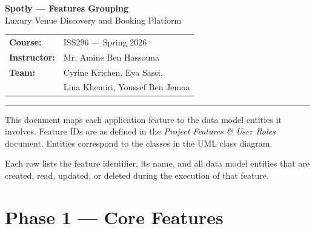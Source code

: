 \documentclass[12pt,a4paper]{article}
\begin{document}
\begin{center}
    {\LARGE\bfseries Spotly --- Features Grouping}\\[0.5em]
    {\large Luxury Venue Discovery and Booking Platform}\\[1em]
    \begin{tabular}{ll}
        \textbf{Course:}      & ISS296 --- Spring 2026 \\
        \textbf{Instructor:}  & Mr. Amine Ben Hassouna \\
        \textbf{Team:}        & Cyrine Krichen, Eya Sassi, \\
                              & Lina Khemiri, Youssef Ben Jemaa \\
    \end{tabular}
\end{center}

\vspace{1.5em}
\hrule
\vspace{1.5em}

This document maps each application feature to the data model entities it
involves. Feature IDs are as defined in the \emph{Project Features \& User
Roles} document. Entities correspond to the classes in the UML class diagram.

\vspace{1em}
Each row lists the feature identifier, its name, and all data model entities
that are created, read, updated, or deleted during the execution of that
feature.

\section{Phase 1 --- Core Features}
\end{document}
